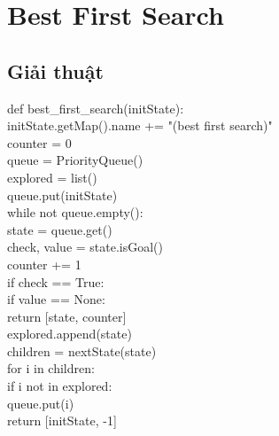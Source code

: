 \documentclass[a4paper]{article}
\begin{document}
\section{Best First Search}
\subsection{Giải thuật}
\begin{flushleft}
	\hspace{2 cm}	def best\_first\_search(initState):\\
	\hspace{3 cm}	initState.getMap().name += "(best first search)"\\
	\hspace{3 cm}	counter = 0\\
	\hspace{3 cm}	queue = PriorityQueue()\\
	\hspace{3 cm}	explored = list()\\
	\hspace{3 cm}	queue.put(initState)\\
	\hspace{3 cm}	while not queue.empty():\\
	\hspace{4 cm}	state = queue.get()\\
	\hspace{4 cm}	check, value = state.isGoal()\\
	\hspace{4 cm}	counter += 1\\
	\hspace{4 cm}	if check == True:\\
	\hspace{5 cm}	if value == None:\\
	\hspace{6 cm}	return [state, counter]\\
	\hspace{4 cm}	explored.append(state)\\
	\hspace{4 cm}	children = nextState(state)\\
	\hspace{4 cm}	for i in children:\\
	\hspace{5 cm}	if i not in explored:\\
	\hspace{6 cm}	queue.put(i)\\
	\hspace{3 cm}	return [initState, -1]\\
\end{flushleft}
\end{document}
